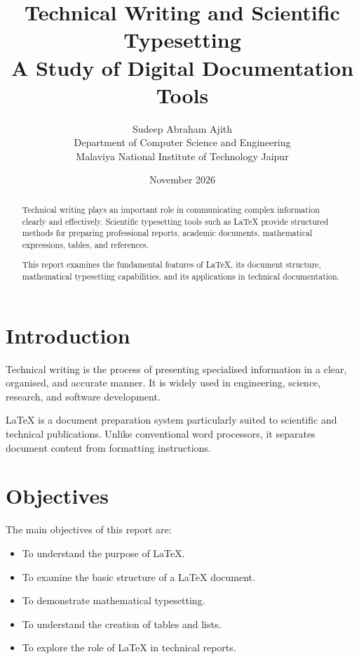 \documentclass[12pt,a4paper]{article}
\title{\textbf{Technical Writing and Scientific Typesetting}\\
\large A Study of Digital Documentation Tools}
\author{Sudeep Abraham Ajith\\
Department of Computer Science and Engineering\\
Malaviya National Institute of Technology Jaipur}
\date{November 2026}
\begin{document}
\maketitle
\thispagestyle{empty}
\newpage

\begin{abstract}
Technical writing plays an important role in communicating
complex information clearly and effectively. Scientific
typesetting tools such as LaTeX provide structured methods
for preparing professional reports, academic documents,
mathematical expressions, tables, and references.

This report examines the fundamental features of LaTeX,
its document structure, mathematical typesetting
capabilities, and its applications in technical
documentation.
\end{abstract}

\newpage
\tableofcontents
\newpage

\section{Introduction}

Technical writing is the process of presenting
specialised information in a clear, organised,
and accurate manner. It is widely used in engineering,
science, research, and software development.

LaTeX is a document preparation system particularly
suited to scientific and technical publications.
Unlike conventional word processors, it separates
document content from formatting instructions.

\section{Objectives}

The main objectives of this report are:

\begin{itemize}
    \item To understand the purpose of LaTeX.
    \item To examine the basic structure of a LaTeX document.
    \item To demonstrate mathematical typesetting.
    \item To understand the creation of tables and lists.
    \item To explore the role of LaTeX in technical reports.
\end{itemize}
\end{document}
